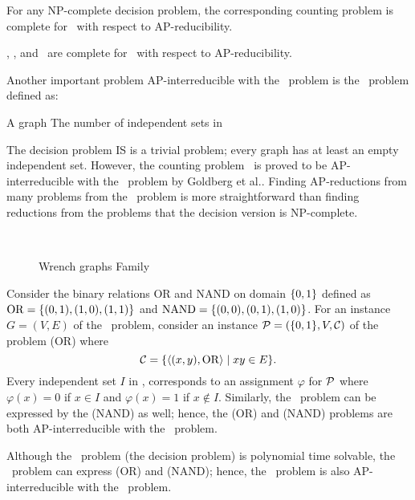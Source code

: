 \begin{theorem}  \label{thrm:npcp}
For any NP-complete decision problem, the corresponding counting problem is complete
for \cp\ with respect to AP-reducibility.
\end{theorem}

\begin{cor}
\csat, \ctsat, and \ctcol\ are complete for \cp\ with respect to AP-reducibility.
\end{cor}

Another important problem AP-interreducible with the \csat\ problem is the \cisp\ problem defined as:

\pnndef%
{A graph \mG}
{The number of independent sets in \mG}

The decision problem IS is a trivial problem; every graph has at least an
empty independent set.
However, the counting problem \cisp\ is proved to be AP-interreducible with the \csat\ problem
by Goldberg et al.\cite{Leslie03}\@.
Finding AP-reductions from many problems from the \cisp\ problem is more straightforward than
finding reductions from the problems that the decision version is NP-complete.

\begin{figure}[h]
\centering 
\subfigure[\ensuremath{Wr_0}]{\label{fig:Wr0}}\hspace{4.78cm}
\subfigure[\ensuremath{Wr_1}]{\label{fig:Wr1}}\\
\subfigure[\ensuremath{Wr_2}]{\label{fig:Wr2}}\hspace{4cm}
\subfigure[\ensuremath{Wr_3}]{\label{fig:Wr3}}
\caption{Wrench graphs Family}
\label{fig:wrench}
\end{figure}

\begin{example}
Consider the binary relations OR and NAND  on domain \(\{{{0,1}}\}\) defined as
\(\mathrm{OR}=\{{(0,1),(1,0),(1,1)}\}\) and \(\mathrm{NAND}=\{{(0,0),(0,1),(1,0)}\}\)\@.
For an instance \(G = (V,E)\) of the \cisp\ problem, consider
an instance \(\mathcal{P}=(\{{{0,1}}\},V,\mathcal{C})\)
of the problem \ccsp(OR) where \[\mathcal{C} = \{\langle (x,y), \mathrm{OR} \rangle \mid xy \in E\}.\]
Every independent set \(I\) in \mG, corresponds to an assignment \(\varphi\)
for \(\mathcal{P}\) where \(\varphi(x) = 0\) if \(x\in I\) and \(\varphi(x)=1\) if \(x\notin I\)\@.
Similarly, the \cisp\ problem can be expressed by the \ccsp(NAND) as well;
hence, the \ccsp(OR) and \ccsp(NAND) problems are both AP-interreducible with the
\csat\ problem.

Although the \dsat\ problem (the decision problem) is polynomial time
solvable, the \cdsat\ problem can express \ccsp(OR) and
\ccsp(NAND); hence, the \cdsat\ problem 
is also AP-interreducible with the \csat\ problem.
\end{example}

